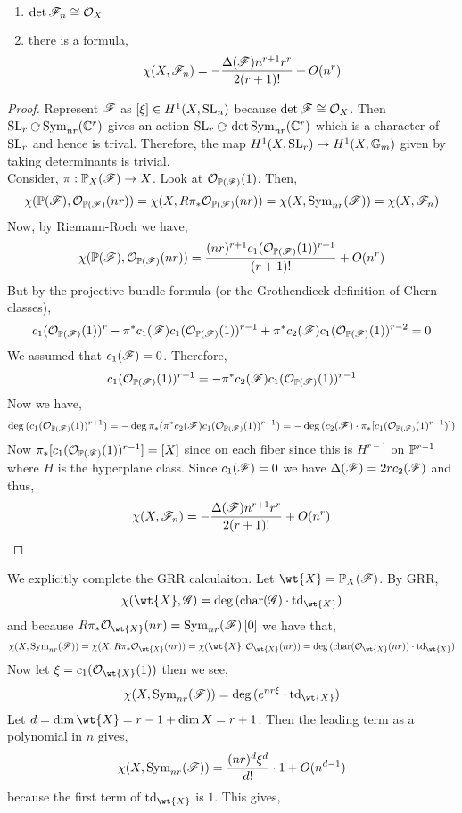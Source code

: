 \documentclass[12pt]{article}
\begin{document}
\begin{lemma}
\begin{enumerate}
\item $\det{\F_n} \cong \struct{X}$
\item there is a formula,
\[ \chi(X, \F_n) = - \frac{\Delta(\F) n^{r+1} r^{r}}{2 (r+1)!} + O(n^r) \]
\end{enumerate}
\end{lemma}

\begin{proof}
Represent $\F$ as $[\xi] \in H^1(X, \SL_n)$ because $\det{\F} \cong \struct{X}$. Then $\SL_{r} \acts \Sym{nr}{\CC^r}$ gives an action $\SL_r \acts \det{\Sym{nr}{\CC^r}}$ which is a character of $\SL_r$ and hence is trival. Therefore, the map $H^1(X, \SL_r) \to H^1(X, \Gm)$ given by taking determinants is trivial. 
\bigskip\\
Consider, $\pi : \P_X(\F) \to X$. Look at $\struct{\P(\F)}(1)$. Then,
\[ \chi(\P(\F), \struct{\P(\F)}(nr)) = \chi(X, R \pi_* \struct{\P(\F)}(nr)) = \chi(X, \Sym{nr}{\F}) = \chi(X, \F_n) \]
Now, by Riemann-Roch we have,
\[ \chi(\P(\F), \struct{\P(\F)}(nr)) = \frac{(nr)^{r+1} c_1(\struct{\P(\F)}(1))^{r+1}}{(r+1)!} + O(n^r) \]
But by the projective bundle formula (or the Grothendieck definition of Chern classes), 
\[ c_1(\struct{\P(\F)}(1))^{r} - \pi^* c_1(\F) c_1(\struct{\P(\F)}(1))^{r-1} + \pi^* c_2(\F) c_1(\struct{\P(\F)}(1))^{r-2} = 0 \]
We assumed that $c_1(\F) = 0$. Therefore, 
\[ c_1(\struct{\P(\F)}(1))^{r+1} = - \pi^* c_2(\F) c_1(\struct{\P(\F)}(1))^{r-1} \]
Now we have,
\[ \deg{(c_1(\struct{\P(\F)}(1))^{r+1})} = -\deg{\pi_*( \pi^* c_2(\F) c_1(\struct{\P(\F)}(1))^{r-1})} = - \deg{(c_2(\F) \cdot \pi_* [c_1(\struct{\P(\F)}(1)^{r-1})])} \]
Now $\pi_* [c_1(\struct{\P(\F)}(1))^{r-1}] = [X]$ since on each fiber since this is $H^{r-1}$ on $\P^{r-1}$ where $H$ is the hyperplane class. Since $c_1(\F) = 0$ we have $\Delta(\F) = 2 r c_2(\F)$ and thus,
\[ \chi(X, \F_n) = - \frac{\Delta(\F) n^{r+1} r^r}{2 (r+1) !} + O(n^r) \]
\end{proof}

\newcommand{\td}{\mathrm{td}}

\begin{rmk}
We explicitly complete the GRR calculaiton. Let $\wt{X} = \P_X(\F)$. By GRR,
\[ \chi(\wt{X}, \G) = \deg{(\ch(\G) \cdot \td_{\wt{X}})} \]
and because $R \pi_* \struct{\wt{X}}(nr) = \Sym{nr}{\F}[0]$ we have that,
\[ \chi(X, \Sym{nr}{\F}) = \chi(X, R \pi_* \struct{\wt{X}}(nr)) = \chi(\wt{X}, \struct{\wt{X}}(nr)) = \deg{(\ch(\struct{\wt{X}}(nr)) \cdot \td_{\wt{X}})} \]
Now let $\xi = c_1(\struct{\wt{X}}(1))$ then we see,
\[ \chi(X, \Sym{nr}{\F}) = \deg{(e^{nr \xi} \cdot \td_{\wt{X}})} \]
Let $d = \dim{\wt{X}} = r - 1 + \dim{X} = r + 1$. Then the leading term as a polynomial in $n$ gives,
\[ \chi(X, \Sym{nr}{\F}) = \frac{(nr)^d \xi^d}{d!} \cdot 1 + O(n^{d-1}) \]
because the first term of $\td_{\wt{X}}$ is $1$. This gives, 
\end{rmk}
\end{document}
